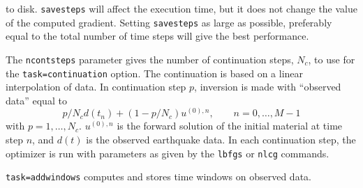 \documentclass[12pt]{report}
\begin{document}
to disk. {\tt savesteps} will affect the execution time, but it does not change the
value of the computed gradient. Setting {\tt savesteps} as large as possible, 
preferably equal to the total number of time steps will give the best performance.
\par
The {\tt ncontsteps} parameter gives the number of continuation steps, $N_c$, to use 
for the {\tt task=continuation} option. The continuation is based on a linear
interpolation of data. In continuation step $p$, inversion is made 
with ``observed data'' equal to
$$
     p/N_c d(t_n) + (1-p/N_c)u^{(0),n},\qquad n=0,\ldots,M-1
$$
with $p=1,\ldots,N_c$. $u^{(0),n}$ is the forward solution of the initial material at time step $n$, and
$d(t)$ is the observed earthquake data. In each continuation step, the optimizer is
run with parameters as given by the {\tt lbfgs} or {\tt nlcg} commands.
\par
{\tt task=addwindows} computes and stores time windows on observed data. 
\end{document}
